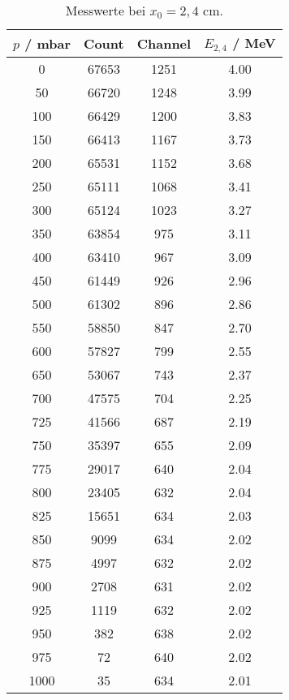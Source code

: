 \begin{table}[!htp]
\centering
\caption{Messwerte bei $x_0 = 2,4$ cm.}
\label{tab:d24cm}
\begin{tabular}{S[table-format=4.0] S[table-format=5.0] S[table-format=4.0] S[table-format=1.2]}
\toprule
{$p$ / mbar} & {Count} & {Channel} & {$E_{2,4}$ / MeV} \\
 & 67653 & 1251 & 4.00 \\
  50 & 66720 & 1248 & 3.99 \\
 100 & 66429 & 1200 & 3.83 \\
 150 & 66413 & 1167 & 3.73 \\
 200 & 65531 & 1152 & 3.68 \\
 250 & 65111 & 1068 & 3.41 \\
 300 & 65124 & 1023 & 3.27 \\
 350 & 63854 &  975 & 3.11 \\
 400 & 63410 &  967 & 3.09 \\
 450 & 61449 &  926 & 2.96 \\
 500 & 61302 &  896 & 2.86 \\
 550 & 58850 &  847 & 2.70 \\
 600 & 57827 &  799 & 2.55 \\
 650 & 53067 &  743 & 2.37 \\
 700 & 47575 &  704 & 2.25 \\
 725 & 41566 &  687 & 2.19 \\
 750 & 35397 &  655 & 2.09 \\
 775 & 29017 &  640 & 2.04 \\
 800 & 23405 &  632 & 2.04 \\
 825 & 15651 &  634 & 2.03 \\
 850 &  9099 &  634 & 2.02 \\
 875 &  4997 &  632 & 2.02 \\
 900 &  2708 &  631 & 2.02 \\
 925 &  1119 &  632 & 2.02 \\
 950 &   382 &  638 & 2.02 \\
 975 &    72 &  640 & 2.02 \\
1000 &    35 &  634 & 2.01 \\
\bottomrule
\end{tabular}
\end{table}